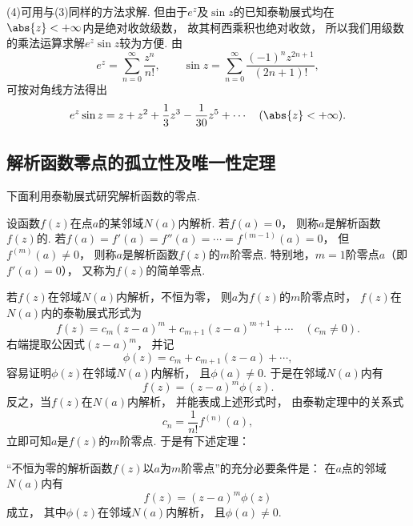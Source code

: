 \begin{example}
\begin{solution}
(4)可用与(3)同样的方法求解.
但由于\(e^z\)及\(\sin z\)的已知泰勒展式均在\(\abs{z}<+\infty\)内是绝对收敛级数，
故其柯西乘积也绝对收敛，
所以我们用级数的乘法运算求解\(e^z \sin z\)较为方便.
由\begin{equation*}
	e^z = \sum_{n=0}^\infty \frac{z^n}{n!},
	\qquad
	\sin z = \sum_{n=0}^\infty \frac{(-1)^n z^{2n+1}}{(2n+1)!},
\end{equation*}
可按对角线方法得出\begin{equation*}
	e^z \sin z
	= z + z^2 + \frac13 z^3 - \frac1{30} z^5 + \dotsb
	\quad(\abs{z}<+\infty).
\end{equation*}
\end{solution}
\end{example}

\subsection{解析函数零点的孤立性及唯一性定理}
下面利用泰勒展式研究解析函数的零点.
\begin{definition}\label{definition:解析函数的级数表示.零点}
设函数\(f(z)\)在点\(a\)的某邻域\(N(a)\)内解析.
若\(f(a)=0\)，
则称\(a\)是解析函数\(f(z)\)的.
若\(f(a)=f'(a)=f''(a)=\dotsb=f^{(m-1)}(a)=0\)，
但\(f^{(m)}(a)\neq0\)，
则称\(a\)是解析函数\(f(z)\)的\(m\)阶零点.
特别地，\(m=1\)阶零点\(a\)（即\(f'(a)=0\)），
又称为\(f(z)\)的简单零点.
\end{definition}

若\(f(z)\)在邻域\(N(a)\)内解析，不恒为零，
则\(a\)为\(f(z)\)的\(m\)阶零点时，
\(f(z)\)在\(N(a)\)内的泰勒展式形式为\begin{equation*}
	f(z) = c_m (z-a)^m + c_{m+1} (z-a)^{m+1} + \dotsb \quad(c_m\neq0).
\end{equation*}
右端提取公因式\((z-a)^m\)，
并记\begin{equation*}
	\phi(z) = c_m + c_{m+1} (z-a) + \dotsb,
\end{equation*}
容易证明\(\phi(z)\)在邻域\(N(a)\)内解析，
且\(\phi(a)\neq0\).
于是在邻域\(N(a)\)内有\begin{equation*}
	f(z) = (z-a)^m \phi(z).
\end{equation*}
反之，当\(f(z)\)在\(N(a)\)内解析，
并能表成上述形式时，
由泰勒定理中的关系式\begin{equation*}
	c_n = \frac1{n!} f^{(n)}(a),
\end{equation*}
立即可知\(a\)是\(f(z)\)的\(m\)阶零点.
于是有下述定理：
\begin{theorem}\label{theorem:解析函数的级数表示.零点定理}
“不恒为零的解析函数\(f(z)\)以\(a\)为\(m\)阶零点”的充分必要条件是：
在\(a\)点的邻域\(N(a)\)内有\begin{equation*}
	f(z) = (z-a)^m \phi(z)
\end{equation*}成立，
其中\(\phi(z)\)在邻域\(N(a)\)内解析，
且\(\phi(a)\neq0\).
\end{theorem}


